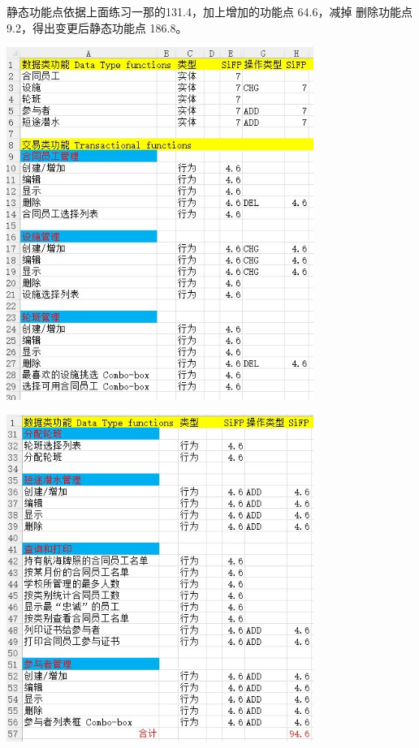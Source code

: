 静态功能点依据上面练习一那的131.4，加上增加的功能点 64.6，减掉
删除功能点 9.2，得出变更后静态功能点 186.8。


\includegraphics[width=10cm]{Ex2XlsScreenshot_2022-04-05_143941.jpg}


\includegraphics[width=10cm]{Ex2XlsPt2of2Screenshot_2022-04-05_143941.jpg}

